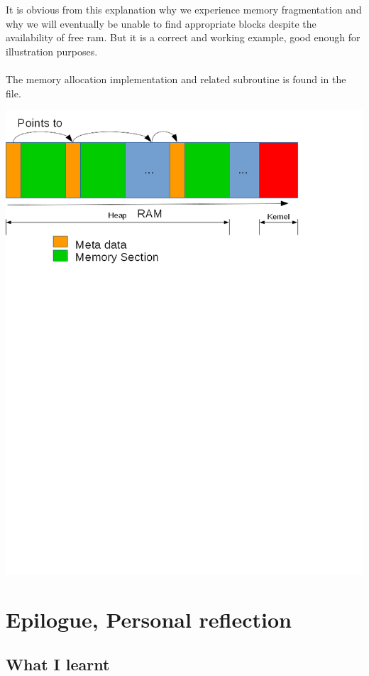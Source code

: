 \documentclass[12pt, svgnames]{book}
\begin{document}
\\~\\
It is obvious from this explanation why we experience memory fragmentation and why we will eventually be unable to find appropriate blocks despite the availability of free ram. But it is a correct and working example, good enough for illustration purposes.
\\~\\
The memory allocation implementation and related subroutine is found in the \href{https://github.com/Makogan/PiOS/blob/master/source/Hardware/Memory/memory_management.cpp}{} file.


\centering
\includegraphics[scale=1]{MemoryAllocation.png}
\flushleft
\part{Epilogue, Personal reflection}

\chapter*{What I learnt}
\end{document}
